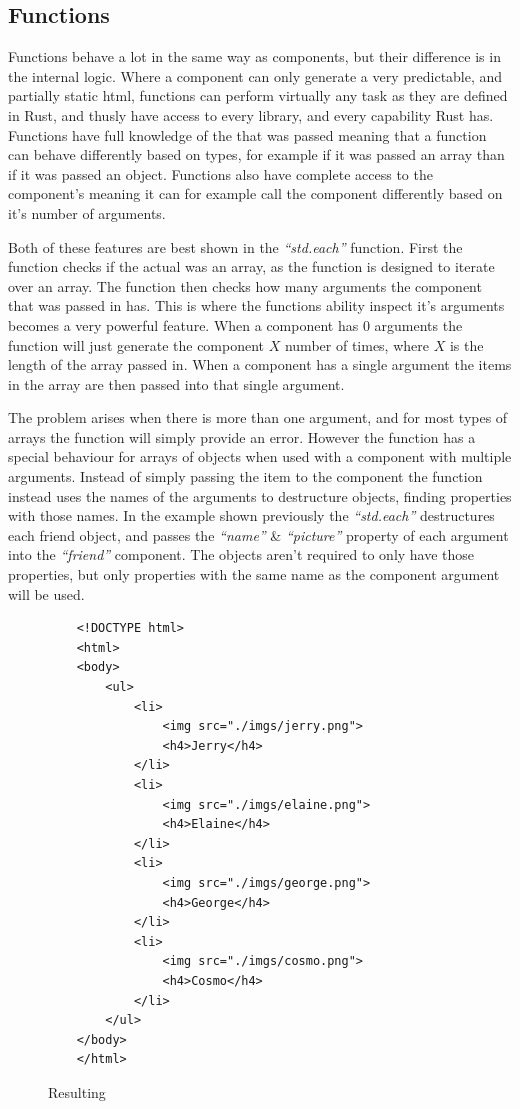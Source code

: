 \subsection{Functions}
Functions behave a lot in the same way as components, but their difference is in the internal logic. Where a component can only generate a very predictable, and partially static html, functions can perform virtually any task as they are defined in Rust, and thusly have access to every library, and every capability Rust has. Functions have full knowledge of the  that was passed meaning that a function can behave differently  based on types, for example if it was passed an array than if it was passed an object. Functions also have complete access to the component's  meaning it can for example call the component differently based on it's number of arguments.

Both of these features are best shown in the \textit{``std.each''} function. First the function checks if the actual  was an array, as the function is designed to iterate over an array. The function then checks how many arguments the component that was passed in has. This is where the functions ability inspect it's arguments becomes a very powerful feature. When a component has 0 arguments the function will just generate the component $X$ number of times, where $X$ is the length of the array passed in. When a component has a single argument the items in the array are then passed into that single argument.

The problem arises when there is more than one argument, and for most types of arrays the function will simply provide an error. However the function has a special behaviour for arrays of objects when used with a component with multiple arguments. Instead of simply passing the item to the component the function instead uses the names of the arguments to destructure objects, finding properties with those names. In the example shown previously the \textit{``std.each''} destructures each friend object, and passes the \textit{``name''} \& \textit{``picture''} property of each argument into the \textit{``friend''} component. The objects aren't required to only have those properties, but only properties with the same name as the component argument will be used.

\begin{figure}[!htbp]
    \begin{verbatim}
    <!DOCTYPE html>
    <html>
    <body>
        <ul>
            <li>
                <img src="./imgs/jerry.png">
                <h4>Jerry</h4>
            </li>
            <li>
                <img src="./imgs/elaine.png">
                <h4>Elaine</h4>
            </li>
            <li>
                <img src="./imgs/george.png">
                <h4>George</h4>
            </li>
            <li>
                <img src="./imgs/cosmo.png">
                <h4>Cosmo</h4>
            </li>
        </ul>    
    </body>
    </html>
    \end{verbatim}
    \caption{Resulting }
    \label{fig:htmlResult}
\end{figure}
